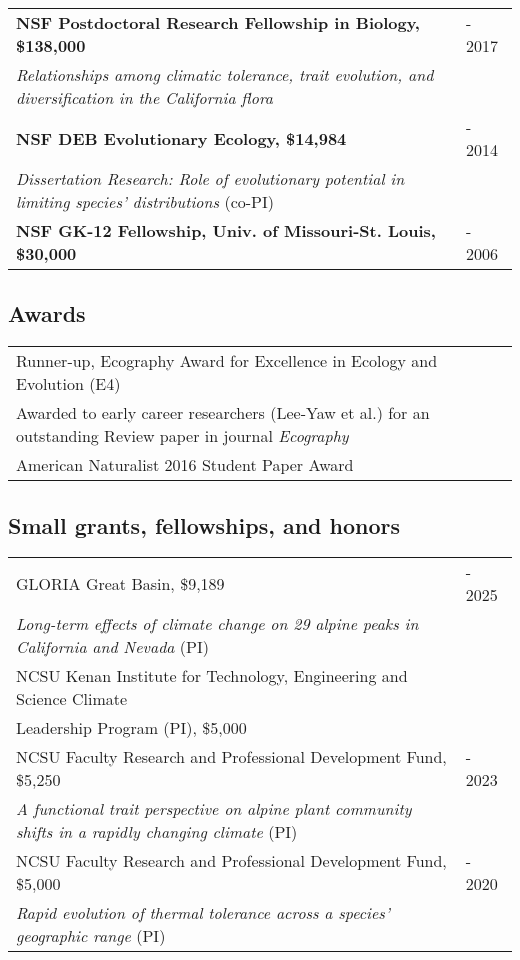 \documentclass[11pt,english]{article}\usepackage[]{graphicx}\usepackage[]{xcolor}
\providecommand{\tabularnewline}{\\}
\begin{document}
\begin{tabularx}{\textwidth}{@{}>{\raggedright}p{5.25in} >{\raggedleft}X@{}}
\textbf{NSF Postdoctoral Research Fellowship in Biology, \$138,000} & 2016 - 2017 \tabularnewline
\addtolength{\leftskip}{5ex}\emph{Relationships among climatic tolerance, trait evolution, and diversification in the California flora} \tabularnewline

\textbf{NSF DEB Evolutionary Ecology, \$14,984} & 2012 - 2014 \tabularnewline
\addtolength{\leftskip}{5ex}\emph{Dissertation Research: Role of evolutionary potential in limiting species' distributions} (co-PI)
\vspace{0.5ex} \tabularnewline

\textbf{NSF GK-12 Fellowship, Univ. of Missouri-St. Louis, \$30,000} & 2005 - 2006\tabularnewline
\end{tabularx}

\subsection*{Awards}
\renewcommand{\arraystretch}{1.2}
\begin{tabularx}{\textwidth}{@{}>{\raggedright}p{5.25in} >{\raggedleft}X@{}}

Runner-up, Ecography Award for Excellence in Ecology and Evolution (E4) & 2022 \tabularnewline
\addtolength{\leftskip}{5ex} Awarded to early career researchers (Lee-Yaw et al.) for an outstanding Review paper in journal \emph{Ecography} & \tabularnewline
American Naturalist 2016 Student Paper Award & 2017 \tabularnewline

\end{tabularx}

\subsection*{Small grants, fellowships, and honors}
\renewcommand{\arraystretch}{1.2}
\begin{tabularx}{\textwidth}{@{}>{\raggedright}p{5.25in} >{\raggedleft}X@{}}

GLORIA Great Basin, \$9,189 & 2024 - 2025 \tabularnewline
\addtolength{\leftskip}{5ex} \emph{Long-term effects of climate change on 29 alpine peaks in California and Nevada} (PI) & \tabularnewline

NCSU Kenan Institute for Technology, Engineering and Science Climate & 2023 \tabularnewline
\addtolength{\leftskip}{5ex} Leadership Program (PI), \$5,000 \tabularnewline

NCSU Faculty Research and Professional Development Fund, \$5,250 & 2022 - 2023 \tabularnewline
\addtolength{\leftskip}{5ex}\emph{A functional trait perspective on alpine plant community shifts in a rapidly changing climate} (PI)  & \tabularnewline

NCSU Faculty Research and Professional Development Fund, \$5,000 & 2019 - 2020 \tabularnewline
\addtolength{\leftskip}{5ex}\emph{Rapid evolution of thermal tolerance across a species' geographic range} (PI)  & \tabularnewline

\end{tabularx}
\end{document}
